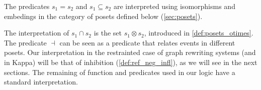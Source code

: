 
The predicates $s_1 = s_2$ and $s_1\subseteq s_2$ are interpreted using isomorphisms and embedings in the category of posets defined below (\autoref{sec:posets}).

The interpretation of $s_1\cap s_2$ is the set $s_1\otimes s_2$, introduced in \autoref{def:posets_otimes}. The predicate $\dashv$ can be seen as a predicate that relates events in different posets. Our interpretation in the restrainted case of graph rewriting systems (and in Kappa) will be that of inhibition (\autoref{def:ref_neg_infl}), as we will see in the next sections. The remaining of function and predicates used in our logic have a standard interpretation.

